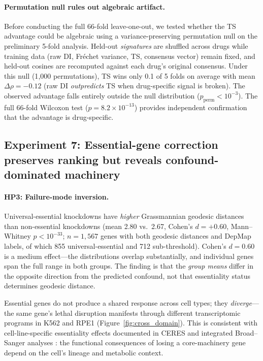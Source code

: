 \documentclass[10pt]{article}
\begin{document}
\paragraph{Permutation null rules out algebraic artifact.}
Before conducting the full 66-fold leave-one-out, we tested whether the
TS advantage could be algebraic using a variance-preserving permutation
null on the preliminary 5-fold analysis. Held-out
\emph{signatures} are shuffled across drugs while training data
(raw DI, Fr\'echet variance, TS, consensus vector) remain fixed,
and held-out cosines are recomputed against each drug's original
consensus. Under this null (1{,}000 permutations),
TS wins only 0.1 of 5 folds on average with mean $\Delta\rho = -0.12$
(raw DI \emph{outpredicts} TS when drug-specific signal is broken).
The observed advantage falls entirely outside the null distribution
($p_{\text{perm}} < 10^{-3}$). The full 66-fold Wilcoxon test
($p = 8.2 \times 10^{-13}$) provides independent confirmation that the
advantage is drug-specific.

\subsection{Experiment 7: Essential-gene correction preserves ranking
but reveals confound-dominated machinery}

\paragraph{HP3: Failure-mode inversion.}
Universal-essential knockdowns have \emph{higher} Grassmannian geodesic
distances than non-essential knockdowns (mean 2.80 vs.\ 2.67, Cohen's $d =
+0.60$, Mann--Whitney $p < 10^{-33}$; $n = 1{,}567$ genes with both
geodesic distances and DepMap labels, of which 855 universal-essential and
712 sub-threshold). Cohen's $d = 0.60$ is a medium effect---the
distributions overlap substantially, and individual genes span the full
range in both groups. The finding is that the \emph{group means} differ
in the opposite direction from the predicted confound, not that essentiality
status determines geodesic distance.

Essential genes do not produce a shared response across cell types; they
\emph{diverge}---the same gene's lethal disruption manifests through
different transcriptomic programs in K562 and RPE1
(Figure~\ref{fig:cross_domain}). This is consistent with cell-line-specific
essentiality effects documented in CERES \citep{meyers2017ceres} and
integrated Broad--Sanger analyses \citep{pacini2021integrated}: the
functional consequences of losing a core-machinery gene depend on
the cell's lineage and metabolic context.
\end{document}
